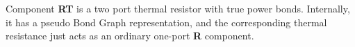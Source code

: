 Component \textbf{RT} is a two port thermal resistor with true power
bonds. Internally, it has a pseudo Bond Graph representation, and the
corresponding thermal resistance just acts as an ordinary one-port
\textbf{R} component.
 
